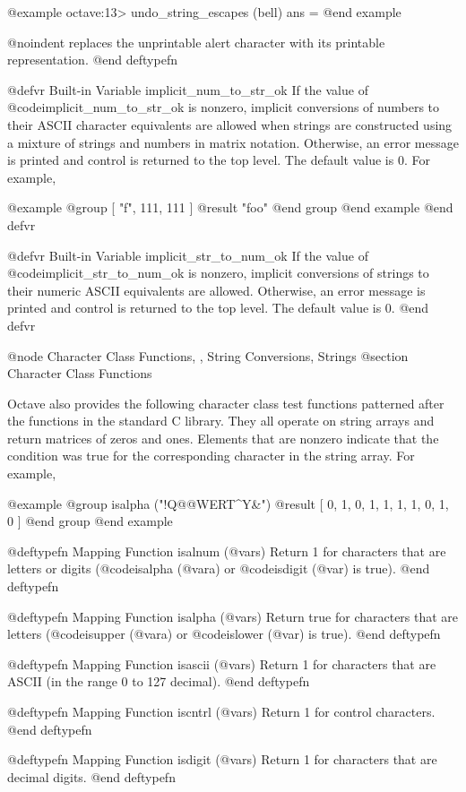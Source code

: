 {{{{@example
octave:13> undo_string_escapes (bell)
ans = \a
@end example

@noindent
replaces the unprintable alert character with its printable
representation.
@end deftypefn

@defvr {Built-in Variable} implicit_num_to_str_ok
If the value of @code{implicit_num_to_str_ok} is nonzero, implicit
conversions of numbers to their ASCII character equivalents are
allowed when strings are constructed using a mixture of strings and
numbers in matrix notation.  Otherwise, an error message is printed and
control is returned to the top level. The default value is 0.  For
example,

@example
@group
[ "f", 111, 111 ]
     @result{} "foo"
@end group
@end example
@end defvr

@defvr {Built-in Variable} implicit_str_to_num_ok
If the value of @code{implicit_str_to_num_ok} is nonzero, implicit
conversions of strings to their numeric ASCII equivalents are allowed.
Otherwise, an error message is printed and control is returned to the
top level.  The default value is 0.
@end defvr

@node Character Class Functions,  , String Conversions, Strings
@section Character Class Functions

Octave also provides the following character class test functions
patterned after the functions in the standard C library.  They all
operate on string arrays and return matrices of zeros and ones.
Elements that are nonzero indicate that the condition was true for the
corresponding character in the string array.  For example,

@example
@group
isalpha ("!Q@@WERT^Y&")
     @result{} [ 0, 1, 0, 1, 1, 1, 1, 0, 1, 0 ]
@end group
@end example

@deftypefn {Mapping Function} {} isalnum (@var{s})
Return 1 for characters that are letters or digits (@code{isalpha
(@var{a})} or @code{isdigit (@var{})} is true).
@end deftypefn

@deftypefn {Mapping Function} {} isalpha (@var{s})
Return true for characters that are letters (@code{isupper (@var{a})}
or @code{islower (@var{})} is true). 
@end deftypefn

@deftypefn {Mapping Function} {} isascii (@var{s})
Return 1 for characters that are ASCII (in the range 0 to 127 decimal).
@end deftypefn

@deftypefn {Mapping Function} {} iscntrl (@var{s})
Return 1 for control characters.
@end deftypefn

@deftypefn {Mapping Function} {} isdigit (@var{s})
Return 1 for characters that are decimal digits.
@end deftypefn

}}}}
